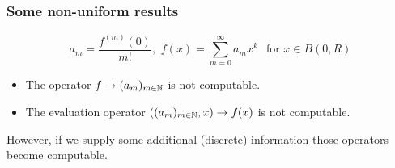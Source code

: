 \begin{frame}
\frametitle{Some non-uniform results}
$$a_m =\frac{f^{(m)}(0)}{m!} 
, \,\, f(x) = \sum_{m=0}^\infty a_mx^k \,\ \text{ for } x \in B(0,R)
$$
\vfill
\begin{theorem}[M\"uller (1995)]
\begin{itemize}
\item The operator $f \to (a_m)_{m \in \mathbb{N}}$ is not computable.
\item The evaluation operator $((a_m)_{m \in \mathbb{N}},x) \to f(x) $ is not computable.
\end{itemize}
\end{theorem}
\pause
However, if we supply some additional (discrete) information those operators become computable.
\end{frame}
